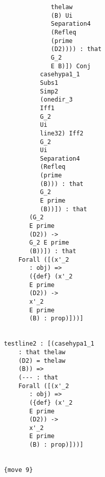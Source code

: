 \documentclass[12pt]{article}
\begin{document}
\begin{verbatim}
                                           thelaw 
                                           (B) Ui 
                                           Separation4 
                                           (Refleq 
                                           (prime 
                                           (D2)))) : that 
                                           G_2 
                                           E B)]) Conj 
                                        casehypa1_1 
                                        Subs1 
                                        Simp2 
                                        (onedir_3 
                                        Iff1 
                                        G_2 
                                        Ui 
                                        line32) Iff2 
                                        G_2 
                                        Ui 
                                        Separation4 
                                        (Refleq 
                                        (prime 
                                        (B))) : that 
                                        G_2 
                                        E prime 
                                        (B))]) : that 
                                     (G_2 
                                     E prime 
                                     (D2)) -> 
                                     G_2 E prime 
                                     (B))]) : that 
                                  Forall ([(x'_2 
                                     : obj) => 
                                     ({def} (x'_2 
                                     E prime 
                                     (D2)) -> 
                                     x'_2 
                                     E prime 
                                     (B) : prop)]))]


                              testline2 : [(casehypa1_1 
                                  : that thelaw 
                                  (D2) = thelaw 
                                  (B)) => 
                                  (--- : that 
                                  Forall ([(x'_2 
                                     : obj) => 
                                     ({def} (x'_2 
                                     E prime 
                                     (D2)) -> 
                                     x'_2 
                                     E prime 
                                     (B) : prop)]))]


                              {move 9}


\end{verbatim}
\end{document}
